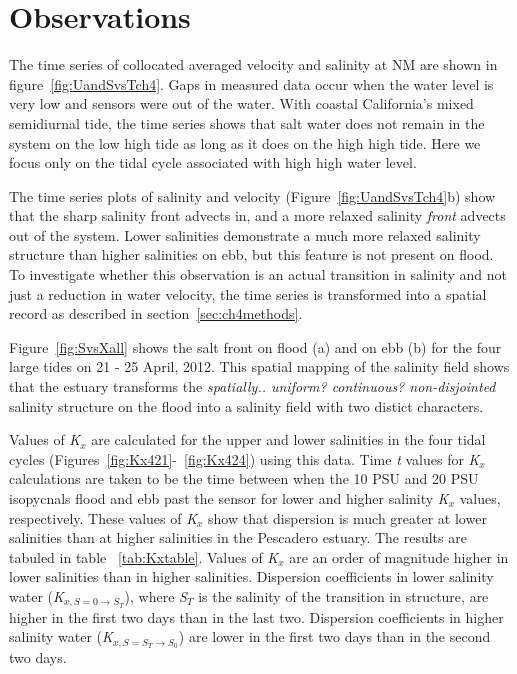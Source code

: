 \section{Observations} \label{sec:ObsCh4}
The time series of collocated averaged velocity and salinity at NM are shown in figure~\ref{fig:UandSvsTch4}. Gaps in measured data occur when the water level is very low and sensors were out of the water. With coastal California's mixed semidiurnal tide, the time series shows that salt water does not remain in the system on the low high tide as long as it does on the high high tide. Here we focus only on the tidal cycle associated with high high water level. 

The time series plots of salinity and velocity (Figure~\ref{fig:UandSvsTch4}b) show that the sharp salinity front advects in, and a more relaxed salinity \emph{front} advects out of the system. Lower salinities demonstrate a much more relaxed salinity structure than higher salinities on ebb, but this feature is not present on flood. To investigate whether this observation is an actual transition in salinity and not just a reduction in water velocity, the time series is transformed into a spatial record as described in section~\ref{sec:ch4methods}. 

Figure~\ref{fig:SvsXall} shows the salt front on flood (a) and on ebb (b) for the four large tides on 21 - 25 April, 2012. This spatial mapping of the salinity field shows that the estuary transforms the \emph{spatially.. uniform? continuous? non-disjointed} salinity structure on the flood into a salinity field with two distict characters.

Values of \emph{K$_x$} are calculated for the upper and lower salinities in the four tidal cycles (Figures~\ref{fig:Kx421}-~\ref{fig:Kx424}) using this data. Time \emph{t} values for \emph{K$_x$} calculations are taken to be the time between when the 10 PSU and 20 PSU isopycnals flood and ebb past the sensor for lower and higher salinity \emph{K$_x$} values, respectively. These values of \emph{K$_x$} show that dispersion is much greater at lower salinities than at higher salinities in the Pescadero estuary. The results are tabuled in table ~\ref{tab:Kxtable}. Values of \emph{K$_x$} are an order of magnitude higher in lower salinities than in higher salinities. Dispersion coefficients in lower salinity water (\emph{K$_{x,S=0 \rightarrow S_T}$}), where \emph{S$_T$} is the salinity of the transition in structure, are higher in the first two days than in the last two. Dispersion coefficients in higher salinity water (\emph{K$_{x,S=S_T \rightarrow S_0}$}) are lower in the first two days than in the second two days. 

